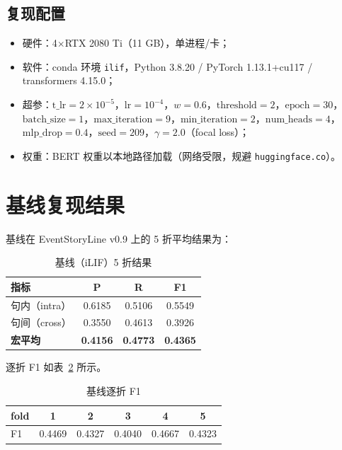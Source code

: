 \documentclass[11pt,a4paper]{ctexart}
\begin{document}
\subsection{复现配置}

\begin{itemize}
\item 硬件：4$\times$RTX 2080 Ti（11 GB），单进程/卡；
\item 软件：conda 环境 \texttt{ilif}，Python 3.8.20 / PyTorch 1.13.1+cu117 / transformers 4.15.0；
\item 超参：$\mathrm{t\_lr}=2\times10^{-5}$，$\mathrm{lr}=10^{-4}$，$w=0.6$，$\mathrm{threshold}=2$，$\mathrm{epoch}=30$，$\mathrm{batch\_size}=1$，$\mathrm{max\_iteration}=9$，$\mathrm{min\_iteration}=2$，$\mathrm{num\_heads}=4$，$\mathrm{mlp\_drop}=0.4$，$\mathrm{seed}=209$，$\gamma=2.0$（focal loss）；
\item 权重：BERT 权重以本地路径加载（网络受限，规避 \texttt{huggingface.co}）。
\end{itemize}

\section{基线复现结果}

基线在 EventStoryLine v0.9 上的 5 折平均结果为：

\begin{table}[H]
\centering
\caption{基线（iLIF）5 折结果}
\label{tab:baseline}
\begin{tabular}{lccc}
\toprule
指标 & P & R & F1 \\
\midrule
句内（intra） & 0.6185 & 0.5106 & 0.5549 \\
句间（cross） & 0.3550 & 0.4613 & 0.3926 \\
\textbf{宏平均} & \textbf{0.4156} & \textbf{0.4773} & \textbf{0.4365} \\
\bottomrule
\end{tabular}
\end{table}

逐折 F1 如表~\ref{tab:baseline_fold} 所示。

\begin{table}[H]
\centering
\caption{基线逐折 F1}
\label{tab:baseline_fold}
\begin{tabular}{lccccc}
\toprule
fold & 1 & 2 & 3 & 4 & 5 \\
\midrule
F1 & 0.4469 & 0.4327 & 0.4040 & 0.4667 & 0.4323 \\
\bottomrule
\end{tabular}
\end{table}
\end{document}
